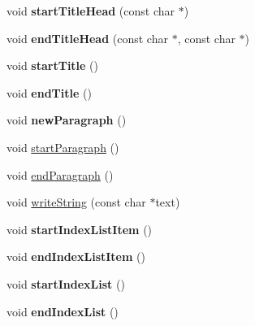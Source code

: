 \begin{DoxyCompactItemize}
\item 
\hypertarget{class_man_generator_a3f80d51c2cd9ad266f0dc628d4c349da}{void {\bfseries start\-Title\-Head} (const char $\ast$)}\label{class_man_generator_a3f80d51c2cd9ad266f0dc628d4c349da}

\item 
\hypertarget{class_man_generator_a9a24c735543f9033745a0179c5633d4c}{void {\bfseries end\-Title\-Head} (const char $\ast$, const char $\ast$)}\label{class_man_generator_a9a24c735543f9033745a0179c5633d4c}

\item 
\hypertarget{class_man_generator_a1259e131d6695a4bb53ec5e36692840a}{void {\bfseries start\-Title} ()}\label{class_man_generator_a1259e131d6695a4bb53ec5e36692840a}

\item 
\hypertarget{class_man_generator_a7b02cc485cad21197a018533aa05fe79}{void {\bfseries end\-Title} ()}\label{class_man_generator_a7b02cc485cad21197a018533aa05fe79}

\item 
\hypertarget{class_man_generator_ab2d43850490bfdac83306b85c7c6265f}{void {\bfseries new\-Paragraph} ()}\label{class_man_generator_ab2d43850490bfdac83306b85c7c6265f}

\item 
void \hyperlink{class_man_generator_af7f590b00ecbe6117ddc09f0016df0ec}{start\-Paragraph} ()
\item 
void \hyperlink{class_man_generator_a3076b52ebe72e4b56c232817cf2a16f0}{end\-Paragraph} ()
\item 
void \hyperlink{class_man_generator_a02588a2412fdda1d3d31066be2802913}{write\-String} (const char $\ast$text)
\item 
\hypertarget{class_man_generator_a54bfbe844dbbb52acf519e07a207c2e0}{void {\bfseries start\-Index\-List\-Item} ()}\label{class_man_generator_a54bfbe844dbbb52acf519e07a207c2e0}

\item 
\hypertarget{class_man_generator_aec53f232bba59300d9a4fd4b1cf0f753}{void {\bfseries end\-Index\-List\-Item} ()}\label{class_man_generator_aec53f232bba59300d9a4fd4b1cf0f753}

\item 
\hypertarget{class_man_generator_a9b31ceb5ba1248cb820bad23a8c6624a}{void {\bfseries start\-Index\-List} ()}\label{class_man_generator_a9b31ceb5ba1248cb820bad23a8c6624a}

\item 
\hypertarget{class_man_generator_a38fc8c258fcd3d6196e12c1a51018c9a}{void {\bfseries end\-Index\-List} ()}\label{class_man_generator_a38fc8c258fcd3d6196e12c1a51018c9a}


\end{DoxyCompactItemize}
